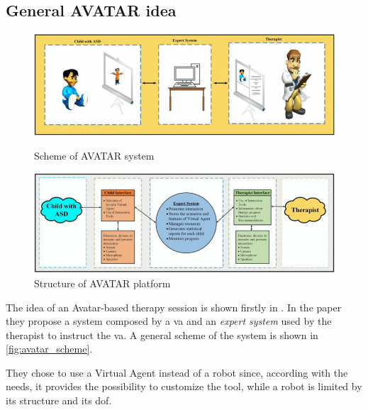 \documentclass[12pt,journal,draftclsnofoot,onecolumn]{IEEEtran}
\begin{document}
\subsection{General AVATAR idea}
\label{sec:avatar_general}

\begin{figure}[h]
\centering

\begin{minipage}{0.48\textwidth}
\centering
\includegraphics[width=\textwidth]{avatar_system.png}
\caption{Scheme of AVATAR system}
\label{fig:avatar_scheme}
\end{minipage}
\begin{minipage}{0.48\textwidth}
\centering
\includegraphics[width=\textwidth]{avatar_tasks.png}
\caption{Structure of AVATAR platform}
\label{fig:avatar_tasks}
\end{minipage}

\end{figure}

The idea of an Avatar-based therapy session is shown firstly in \cite{Guerrero-vasquez}. In the paper they propose a system composed by a \gls{va} and an \textit{expert system} used by the therapist to instruct the \gls{va}. A general scheme of the system is shown in \autoref{fig:avatar_scheme}.

They chose to use a Virtual Agent instead of a robot since, according with the needs, it provides the possibility to customize the tool, while a robot is limited by its structure and its \gls{dof}.
\end{document}
